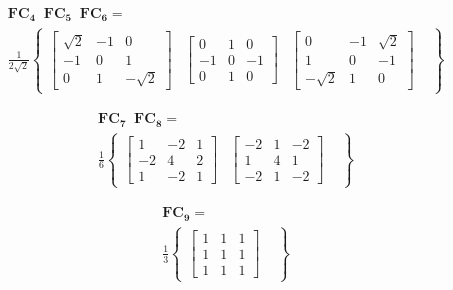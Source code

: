 \begin{eqnarray}
	\mathbf{ FC_{4} \; \; FC_{5} \; \; FC_{6} }  =  \nonumber \\ 
	\frac{1}{2 \sqrt{2}} \left\{ 
	\begin{array}{cccc} 
	\left[  \begin{array}{ccc}  \sqrt{2} & -1 & 0  \\  -1 & 0 & 1 \\ 0 & 1 & -\sqrt{2} \end{array} \right] &
	\left[ \begin{array}{ccc}  0 & 1 & 0  \\  -1 & 0 & -1 \\ 0 & 1 & 0 \end{array} \right] &
	\left[ \begin{array}{ccc}  0 & -1 & \sqrt{2}  \\  1 & 0 & -1 \\ -\sqrt{2} & 1 & 0 \end{array} \right] &
	\end{array} \right\} \nonumber
\label{EqAAC}
\end{eqnarray}

\begin{eqnarray}
	\mathbf{ FC_{7} \; \; FC_{8} }  =  \nonumber \\ 
	\frac{1}{6} \left\{ 
	\begin{array}{cccc} 
	\left[  \begin{array}{ccc}  1 & -2 & 1  \\  -2 & 4 & 2 \\ 1 & -2 & 1 \end{array} \right] &
	\left[ \begin{array}{ccc}  -2 & 1 & -2  \\  1 & 4 & 1 \\ -2 & 1 & -2 \end{array} \right] &
	\end{array} \right\} \nonumber
\label{EqAAD}
\end{eqnarray}

\begin{eqnarray}
	\mathbf{ FC_{9} }  =  \nonumber \\ 
	\frac{1}{3} \left\{ 
	\begin{array}{cccc} 
	\left[  \begin{array}{ccc}  1 & 1 & 1  \\  1 & 1 & 1 \\ 1 & 1 & 1 \end{array} \right] &
	\end{array} \right\}
\label{EqAAE}
\end{eqnarray}

